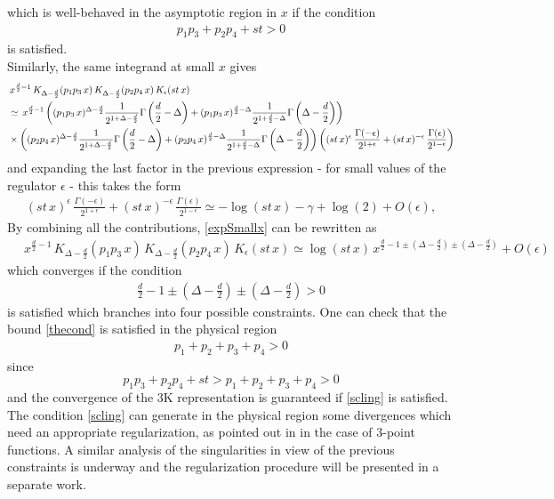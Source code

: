 \documentclass[a4paper,11pt,openright,twoside]{book}
\numberwithin{equation}{section}
\begin{document}
{which is well-behaved in the asymptotic region in $x$ if the condition
\begin{align}
	p_1p_3+p_2p_4+st>0
	\label{thecond}
\end{align}
is satisfied.\\
Similarly, the same integrand at small $x$ gives 
\begin{align}
	&\,x^{\frac{d}{2}-1}\,K_{\Delta-\frac{d}{2}}(p_1p_3\,x)\,K_{\Delta-\frac{d}{2}}(p_2p_4\,x)\,K_{\epsilon}(st\,x)\notag\\
	&\simeq\,x^{\frac{d}{2}-1}\left((p_1p_3\,x)^{\Delta-\frac{d}{2}}\frac{1}{2^{1+\Delta-\frac{d}{2}}}\Gamma\left(\frac{d}{2}-\Delta\right)+(p_1p_3\,x)^{\frac{d}{2}-\Delta}\frac{1}{2^{1+\frac{d}{2}-\Delta}}\Gamma\left(\Delta-\frac{d}{2}\right)\right)\notag\\
	&\times\left((p_2p_4\,x)^{\Delta-\frac{d}{2}}\frac{1}{2^{1+\Delta-\frac{d}{2}}}\Gamma\left(\frac{d}{2}-\Delta\right)+(p_2p_4\,x)^{\frac{d}{2}-\Delta}\frac{1}{2^{1+\frac{d}{2}-\Delta}}\Gamma\left(\Delta-\frac{d}{2}\right)\right)\left((st\,x)^\epsilon\,\frac{\Gamma(-\epsilon)}{2^{1+\epsilon}}+(st\,x)^{-\epsilon}\,\frac{\Gamma(\epsilon)}{2^{1-\epsilon}}\right) \label{expSmallx}
\end{align} 
and expanding the last factor in the previous expression - for small values of  the regulator $\epsilon$ - this takes the form 
\begin{align}
	(st\,x)^\epsilon\,\frac{\Gamma(-\epsilon)}{2^{1+\epsilon}}+(st\,x)^{-\epsilon}\,\frac{\Gamma(\epsilon)}{2^{1-\epsilon}}\simeq -\log(st\,x)-\gamma+\log(2)+O(\epsilon),
\end{align}
By combining all the contributions,  \eqref{expSmallx} can be rewritten as
\begin{align}
	&\,x^{\frac{d}{2}-1}\,K_{\Delta-\frac{d}{2}}(p_1p_3\,x)\,K_{\Delta-\frac{d}{2}}(p_2p_4\,x)\,K_{\epsilon}(st\,x)\simeq\log(st\, x)\,x^{\frac{d}{2}-1\pm\left(\Delta-\frac{d}{2}\right)\pm\left(\Delta-\frac{d}{2}\right)} +O(\epsilon)
\end{align}
which converges if the condition
\begin{align}
	\frac{d}{2}-1\pm\left(\Delta-\frac{d}{2}\right)\pm\left(\Delta-\frac{d}{2}\right)>0
	\label{scling}
\end{align}
is satisfied which branches into four possible constraints. 
One can check that the bound \eqref{thecond} is satisfied in the physical region 
\begin{align} 
	p_1+p_2+p_3+p_4>0
\end{align}
since 
\begin{equation}
	p_1 p_3+p_2p_4+s t>p_1+p_2+p_3+p_4>0
\end{equation}
and the convergence of the 3K representation is guaranteed if \eqref{scling} is satisfied.
The condition \eqref{scling} can generate in the physical region some divergences which need an appropriate regularization, as pointed out in \cite{Bzowski:2015yxv, Bzowski:2015pba} in the case of 3-point functions. A similar analysis of the singularities in view of the previous constraints is underway and the regularization procedure will be presented in a separate work.

}
\end{document}
